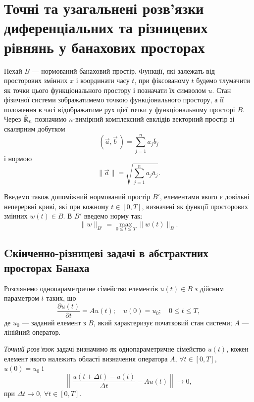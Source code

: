 \chapter{Точні та узагальнені розв'язки диференціальних та різницевих рівнянь у банахових просторах}


Нехай $B$ --- нормований банаховий простір. Функції, які залежать від просторових змінних $x$ і координати часу $t$, при фіксованому $t$ будемо тлумачити як точки цього функціонального простору і позначати їх символом $u$. Стан фізичної системи зображатимемо точкою функціонального простору, а її положення в часі відображатиме рух цієї точки у функціональному просторі $B$. Через $\tilde{\mathbb{R}}_n$  позначимо $n$-вимірний комплексний евклідів векторний простір зі скалярним добутком
\begin{equation*}
    (\vec a, \vec b\,) = \sum_{j = 1}^n a_j \bar b_j
\end{equation*}
і нормою
\begin{equation*}
    \|\vec a\| = \sqrt{\sum_{j = 1}^n a_j \bar a_j}.
\end{equation*}

Введемо також допоміжний нормований простір $B'$, елементами якого є довільні неперервні криві, які при кожному $t \in [0, T]$, визначені як функції просторових змінних $w(t) \in B$. В $B'$ введемо норму так:
\begin{equation*}
    \|w\|_{B'} = \max_{0 \le t \le T} \|w(t)\|_B.
\end{equation*}

\section{Cкінченно-різницеві задачі в абстрактних просторах Банаха}

Розглянемо однопараметричне сімейство елементів $u(t) \in B$ з дійсним параметром $t$ таких, що 
\begin{equation}
    \label{eq:l3.1}
    \frac{\partial u(t)}{\partial t} = A u(t); \quad u(0) = u_0; \quad 0 \le t \le T,
\end{equation}
де $u_0$ --- заданий елемент з $B$, який характеризує початковий стан системи; $A$ --- лінійний оператор. \medskip

\begin{definition}
    \textit{Точний розв'язок} задачі визначимо як однопараметричне сімейство $u(t)$, кожен елемент якого належить області визначення оператора $A$, $\forall t \in [0, T]$, $u(0) = u_0$ і
    \begin{equation}
        \label{eq:l3.2}
        \left\| \frac{u(t + \Delta t) - u(t)}{\Delta t} - A u(t) \right\| \to 0,
    \end{equation}
    при $\Delta t \to 0$, $\forall t \in [0, T]$.
\end{definition}

